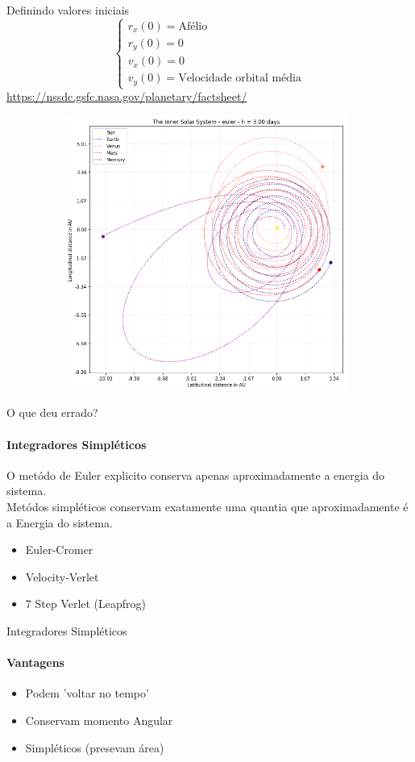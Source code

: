 \documentclass{beamer}
\begin{document}
    \begin{frame}{Definindo valores iniciais}
      \[
      \begin{cases}
        r_x(0) = \text{Afélio}\\
        r_y(0) = 0\\
        v_x(0) = 0\\
        v_y(0) =  \text{Velocidade orbital média}
      \end{cases}
      \]
      \url{https://nssdc.gsfc.nasa.gov/planetary/factsheet/}
    \end{frame}

    \begin{frame}
      \begin{figure}[h]
        \vspace{-0.5cm}
        \includegraphics[width=110mm, height = 90mm]{resources/earth_wrong.png}
      \end{figure}
    \end{frame}

    \begin{frame}{O que deu errado?}
      \framesubtitle{Integradores Simpléticos}%
      O metódo de Euler explicito conserva apenas aproximadamente a energia do sistema.\\
      Metódos simpléticos conservam exatamente uma quantia que aproximadamente é a Energia do sistema.\\
      \caption{Integradores Simpléticos}
      \begin{itemize}
        \item Euler-Cromer
        \item Velocity-Verlet
        \item 7 Step Verlet (Leapfrog)
      \end{itemize}
    \end{frame}
    \begin{frame}{Integradores Simpléticos}
      \framesubtitle{Vantagens}%
      \begin{itemize}
        \item Podem 'voltar no tempo'
        \item Conservam momento Angular
        \item Simpléticos (presevam área)
      \end{itemize}
    \end{frame}
\end{document}
